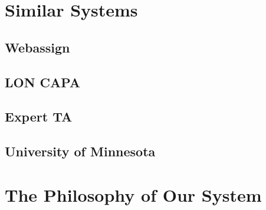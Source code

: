 \section{Similar Systems}

\subsection{Webassign}
\subsection{LON CAPA}
\subsection{Expert TA}
\subsection{University of Minnesota}
\section{The Philosophy of Our System}
